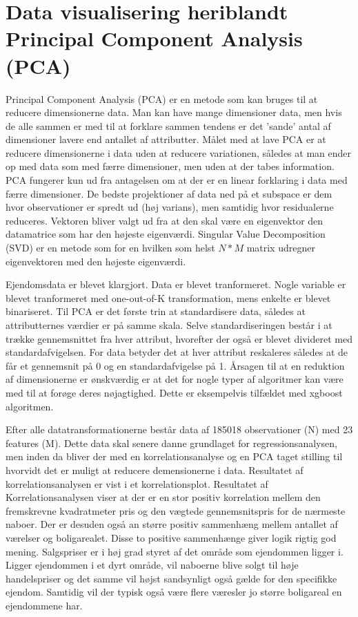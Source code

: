 \documentclass{report}
\begin{document}
\section{Data visualisering heriblandt Principal Component Analysis (PCA)}

Principal Component Analysis (PCA) er en metode som kan bruges til at reducere dimensionerne data. Man kan have mange dimensioner data, men hvis de alle sammen er med til at forklare sammen tendens er det 'sande' antal af dimensioner lavere end antallet af attributter. Målet med at lave PCA er at reducere dimensionerne i data uden at reducere variationen, således at man ender op med data som med færre dimensioner, men uden at der tabes information. PCA fungerer kun ud fra antagelsen om at der er en linear forklaring i data med færre dimensioner. De bedste projektioner af data ned på et subspace er dem hvor observationer er spredt ud (høj varians), men samtidig hvor residualerne reduceres. 
Vektoren bliver valgt ud fra at den skal være en eigenvektor den datamatrice som har den højeste eigenværdi. Singular Value Decomposition (SVD) er en metode som for en hvilken som helst $N*M$ matrix udregner eigenvektoren med den højeste eigenværdi.  

Ejendomsdata er blevet klargjort. Data er blevet tranformeret. Nogle variable er blevet tranformeret med one-out-of-K transformation, mens enkelte er blevet binariseret. 
Til PCA er det første trin at standardisere data, således at attributternes værdier er på samme skala. Selve standardiseringen består i at trække gennemsnittet fra hver attribut, hvorefter der også er blevet divideret med standardafvigelsen. For data betyder det at hver attribut reskaleres således at de får et gennemsnit på 0 og en standardafvigelse på 1. 
Årsagen til at en reduktion af dimensionerne er ønskværdig er at det for nogle typer af algoritmer kan være med til at forøge deres nøjagtighed. Dette er eksempelvis tilfældet med xgboost algoritmen. 

Efter alle datatransformationerne består data af 185018 observationer (N) med 23 features (M).
Dette data skal senere danne grundlaget for regressionsanalysen, men inden da bliver der med en korrelationsanalyse og en PCA taget stilling til hvorvidt det er muligt at reducere demensionerne i data. 
Resultatet af korrelationsanalysen er vist i et korrelationsplot. Resultatet af Korrelationsanalysen viser at der er en stor positiv korrelation mellem den fremskrevne kvadratmeter pris og den vægtede gennemsnitspris for de nærmeste naboer. Der er desuden også an større positiv sammenhæng mellem antallet af værelser og boligarealet. 
Disse to positive sammenhænge giver logik rigtig god mening. Salgspriser er i høj grad styret af det område som ejendommen ligger i. Ligger ejendommen i et dyrt område, vil naboerne blive solgt til høje handelspriser og det samme vil højst sandsynligt også gælde for den specifikke ejendom. 
Samtidig vil der typisk også være flere væresler jo større boligareal en ejendommene har. 
\end{document}
